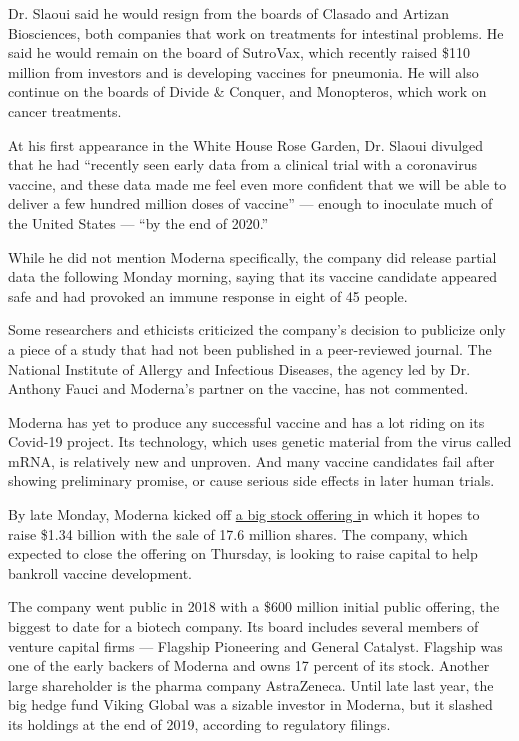 Dr. Slaoui said he would resign from the boards of Clasado and Artizan
Biosciences, both companies that work on treatments for intestinal
problems. He said he would remain on the board of SutroVax, which
recently raised \$110 million from investors and is developing vaccines
for pneumonia. He will also continue on the boards of Divide \& Conquer,
and Monopteros, which work on cancer treatments.

At his first appearance in the White House Rose Garden, Dr. Slaoui
divulged that he had ``recently seen early data from a clinical trial
with a coronavirus vaccine, and these data made me feel even more
confident that we will be able to deliver a few hundred million doses of
vaccine'' --- enough to inoculate much of the United States --- ``by the
end of 2020.''

While he did not mention Moderna specifically, the company did release
partial data the following Monday morning, saying that its vaccine
candidate appeared safe and had provoked an immune response in eight of
45 people.

Some researchers and ethicists criticized the company's decision to
publicize only a piece of a study that had not been published in a
peer-reviewed journal. The National Institute of Allergy and Infectious
Diseases, the agency led by Dr. Anthony Fauci and Moderna's partner on
the vaccine, has not commented.

Moderna has yet to produce any successful vaccine and has a lot riding
on its Covid-19 project. Its technology, which uses genetic material
from the virus called mRNA, is relatively new and unproven. And many
vaccine candidates fail after showing preliminary promise, or cause
serious side effects in later human trials.

By late Monday, Moderna kicked off
\href{https://www.businesswire.com/news/home/20200518005788/en/Moderna-Announces-Pricing-Public-Offering-Shares-Common}{a
big stock offering i}n which it hopes to raise \$1.34 billion with the
sale of 17.6 million shares. The company, which expected to close the
offering on Thursday, is looking to raise capital to help bankroll
vaccine development.

The company went public in 2018 with a \$600 million initial public
offering, the biggest to date for a biotech company. Its board includes
several members of venture capital firms --- Flagship Pioneering and
General Catalyst. Flagship was one of the early backers of Moderna and
owns 17 percent of its stock. Another large shareholder is the pharma
company AstraZeneca. Until late last year, the big hedge fund Viking
Global was a sizable investor in Moderna, but it slashed its holdings at
the end of 2019, according to regulatory filings.

